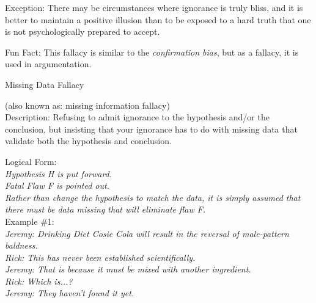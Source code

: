 \documentclass[a4paper,12pt,single,pdftex]{scrbook}
\begin{document}
    
      
    
    
      Exception: There may be circumstances where ignorance is truly bliss, and it is better to maintain a positive illusion than to be exposed to a hard truth that one is not psychologically prepared to accept.
    
    
      
    
    
      Fun Fact: This fallacy is similar to the {\em confirmation bias}, but as a fallacy, it is used in argumentation.
    
  

Missing Data Fallacy
    
      (also known as: missing information fallacy)
    \\

  
    Description: Refusing to admit ignorance to the hypothesis and/or the conclusion, but insisting that your ignorance has to do with missing data that validate both the hypothesis and conclusion.

    
      Logical Form:
    \\

    
      {\em Hypothesis H is put forward.}
    \\

    
      {\em Fatal Flaw F is pointed out.}
    \\

    
      {\em Rather than change the hypothesis to match the data, it is simply assumed that there must be data missing that will eliminate flaw F.}
    \\

    
      Example \#1: 
    \\

    
      {\em Jeremy: Drinking Diet Cosie Cola will result in the reversal of male-pattern baldness.}
    \\

    
      {\em Rick: This has never been established scientifically.}
    \\

    
      {\em Jeremy: That is because it must be mixed with another ingredient.}
    \\

    
      {\em Rick: Which is...?}
    \\

    
      {\em Jeremy: They haven’t found it yet.}
    \\
\end{document}
